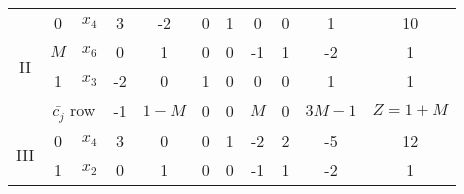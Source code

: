 \documentclass[../main-sheet.tex]{subfiles}
\begin{document}
\begin{soln}
\begin{table}[H]
\begin{tabular}{ccccccccccc}
            \midrule
            \multirow{4}[4]{*}{II}  & 0                                     & $x_4$                                          & 3                                  & \cellcolor[rgb]{ 1,  .8,  .788}-2  & 0                                  & 1                                & 0                                 & 0                                & 1                                 & 10        \\
                                    & \(M\)                                     & $x_6$                                          & \cellcolor[rgb]{ .604,  1,  .6}0   & \cellcolor[rgb]{ .588,  1,  .984}1 & \cellcolor[rgb]{ .604,  1,  .6}0   & \cellcolor[rgb]{ .604,  1,  .6}0 & \cellcolor[rgb]{ .604,  1,  .6}-1 & \cellcolor[rgb]{ .604,  1,  .6}1 & \cellcolor[rgb]{ .604,  1,  .6}-2 & 1         \\
                                    & 1                                     & $x_3$                                          & -2                                 & \cellcolor[rgb]{ 1,  .8,  .788}0   & 1                                  & 0                                & 0                                 & 0                                & 1                                 & 1         \\
            \cmidrule{2-11}         & \multicolumn{2}{c}{$ \bar{c_j} $ row} & -1                                             & \(1-M\)                                & 0                                  & 0                                  & \(M\)                                & 0                                 & \(3M-1\)                             & \(Z=1+M \)                                        \\
            \midrule
            \multirow{4}[4]{*}{III} & 0                                     & $x_4$                                          & \cellcolor[rgb]{ .588,  1,  .984}3 & \cellcolor[rgb]{ .604,  1,  .6}0   & \cellcolor[rgb]{ .604,  1,  .6}0   & \cellcolor[rgb]{ .604,  1,  .6}1 & \cellcolor[rgb]{ .604,  1,  .6}-2 & \cellcolor[rgb]{ .604,  1,  .6}2 & \cellcolor[rgb]{ .604,  1,  .6}-5 & 12        \\
                                    & 1                                     & $ x_2$                                         & \cellcolor[rgb]{ 1,  .8,  .788}0   & 1                                  & 0                                  & 0                                & -1                                & 1                                & -2                                & 1         \\

\end{tabular}
\end{table}
\end{soln}
\end{document}
